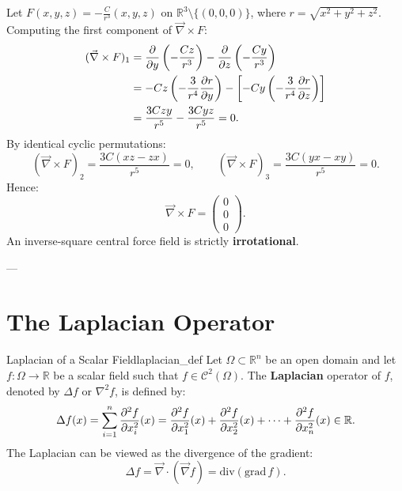 \begin{exemple}
Let $F(x, y, z) = -\frac{C}{r^3}(x, y, z)$ on $\mathbb{R}^3 \setminus \{(0,0,0)\}$, where $r = \sqrt{x^2+y^2+z^2}$. Computing the first component of $\vec{\nabla} \times F$:
\begin{align}
    (\vec{\nabla} \times F)_1 &= \pdv{}{y}\left(-\frac{C z}{r^3}\right) - \pdv{}{z}\left(-\frac{C y}{r^3}\right) \nonumber \\
    &= -C z \left(-\frac{3}{r^4} \pdv{r}{y}\right) - \left[ -C y \left(-\frac{3}{r^4} \pdv{r}{z}\right) \right] \nonumber \\
    &= \frac{3C z y}{r^5} - \frac{3C y z}{r^5} = 0.
\end{align}
By identical cyclic permutations:
\begin{equation}
    (\vec{\nabla} \times F)_2 = \frac{3C(x z - z x)}{r^5} = 0, \qquad (\vec{\nabla} \times F)_3 = \frac{3C(y x - x y)}{r^5} = 0.
\end{equation}
Hence:
\begin{equation}
    \vec{\nabla} \times F = \begin{pmatrix} 0 \\ 0 \\ 0 \end{pmatrix}.
\end{equation}
An inverse-square central force field is strictly \textbf{irrotational}.
\end{exemple}

---

\section{The Laplacian Operator}

\begin{definition}{Laplacian of a Scalar Field}{laplacian_def}
Let $\Omega \subset \mathbb{R}^n$ be an open domain and let $f : \Omega \to \mathbb{R}$ be a scalar field such that $f \in \mathcal{C}^2(\Omega)$. The \textbf{Laplacian} operator of $f$, denoted by $\Delta f$ or $\nabla^2 f$, is defined by:
\begin{equation}
    \Delta f(x) = \sum_{i=1}^n \pdv[2]{f}{x_i}(x) = \pdv[2]{f}{x_1}(x) + \pdv[2]{f}{x_2}(x) + \dots + \pdv[2]{f}{x_n}(x) \in \mathbb{R}.
\end{equation}
The Laplacian can be viewed as the divergence of the gradient:
\begin{equation}
    \Delta f = \vec{\nabla} \cdot (\vec{\nabla} f) = \mathrm{div}(\mathrm{grad}\,f).
\end{equation}
\end{definition}

